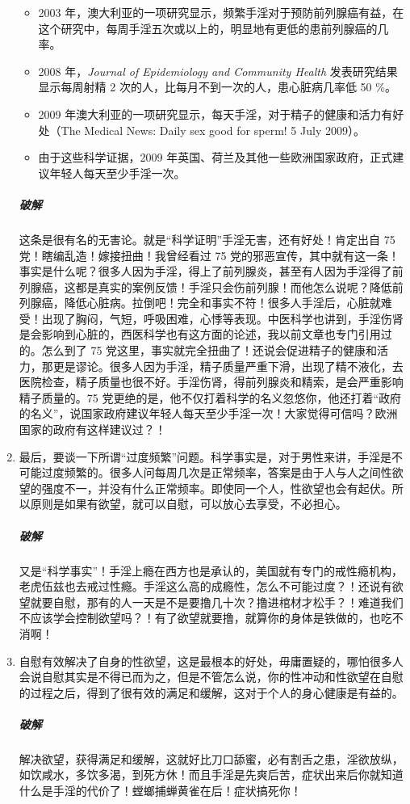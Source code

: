 \documentclass{ctexart}
\begin{document}
\begin{enumerate}
\begin{itemize}
        \item 2003 年，澳大利亚的一项研究显示，频繁手淫对于预防前列腺癌有益，在这个研究中，每周手淫五次或以上的，明显地有更低的患前列腺癌的几率。
        \item 2008 年，\textit{Journal of Epidemiology and Community Health} 发表研究结果显示每周射精 2 次的人，比每月不到一次的人，患心脏病几率低 50 \%。
        \item 2009 年澳大利亚的一项研究显示，每天手淫，对于精子的健康和活力有好处（The Medical News: Daily sex good for sperm! 5 July 2009）。
        \item 由于这些科学证据，2009 年英国、荷兰及其他一些欧洲国家政府，正式建议年轻人每天至少手淫一次。
    \end{itemize}
    \subparagraph{破解} 这条是很有名的无害论。就是“科学证明”手淫无害，还有好处！肯定出自 75 党！瞎编乱造！嫁接扭曲！我曾经看过 75 党的邪恶宣传，其中就有这一条！事实是什么呢？很多人因为手淫，得上了前列腺炎，甚至有人因为手淫得了前列腺癌，这都是真实的案例反馈！手淫只会伤前列腺！而他怎么说呢？降低前列腺癌，降低心脏病。拉倒吧！完全和事实不符！很多人手淫后，心脏就难受！出现了胸闷，气短，呼吸困难，心悸等表现。中医科学也讲到，手淫伤肾是会影响到心脏的，西医科学也有这方面的论述，我以前文章也专门引用过的。怎么到了 75 党这里，事实就完全扭曲了！还说会促进精子的健康和活力，那更是谬论。很多人因为手淫，精子质量严重下滑，出现了精不液化，去医院检查，精子质量也很不好。手淫伤肾，得前列腺炎和精索，是会严重影响精子质量的。75 党更绝的是，他不仅打着科学的名义忽悠你，他还打着“政府的名义”，说国家政府建议年轻人每天至少手淫一次！大家觉得可信吗？欧洲国家的政府有这样建议过？！
    \item 最后，要谈一下所谓“过度频繁”问题。科学事实是，对于男性来讲，手淫是不可能过度频繁的。很多人问每周几次是正常频率，答案是由于人与人之间性欲望的强度不一，并没有什么正常频率。即使同一个人，性欲望也会有起伏。所以原则是如果有欲望，就可以自慰，可以放心去享受，不必担心。
    \subparagraph{破解} 又是“科学事实”！手淫上瘾在西方也是承认的，美国就有专门的戒性瘾机构，老虎伍兹也去戒过性瘾。手淫这么高的成瘾性，怎么不可能过度？！还说有欲望就要自慰，那有的人一天是不是要撸几十次？撸进棺材才松手？！难道我们不应该学会控制欲望吗？！有了欲望就要撸，就算你的身体是铁做的，也吃不消啊！
    \item 自慰有效解决了自身的性欲望，这是最根本的好处，毋庸置疑的，哪怕很多人会说自慰其实是不得已而为之，但是不管怎么说，你的性冲动和性欲望在自慰的过程之后，得到了很有效的满足和缓解，这对于个人的身心健康是有益的。
    \subparagraph{破解} 解决欲望，获得满足和缓解，这就好比刀口舔蜜，必有割舌之患，淫欲放纵，如饮咸水，多饮多渴，到死方休！而且手淫是先爽后苦，症状出来后你就知道什么是手淫的代价了！螳螂捕蝉黄雀在后！症状搞死你！

\end{enumerate}
\end{document}
